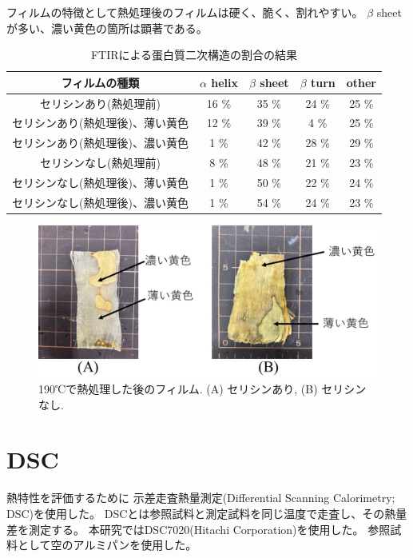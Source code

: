 \documentclass[dvipdfmx,12pt,a4paper]{jreport}
\begin{document}
			フィルムの特徴として熱処理後のフィルムは硬く、脆く、割れやすい。
			$\beta$ sheetが多い、濃い黄色の箇所は顕著である。
			\begin{table}[h]
				\centering
				\caption{FTIRによる蛋白質二次構造の割合の結果}
				\label{FTIR_蛋白質二次構造}
				\begin{tabular}{c c c c c} \hline
					フィルムの種類 & $\alpha$ helix & $\beta$ sheet &$\beta$ turn & other \\ \hline \hline
					セリシンあり(熱処理前) & 16 \% & 35 \% &  24 \% & 25 \% \\
					セリシンあり(熱処理後)、薄い黄色 &  12 \% & 39 \% & 4 \% & 25 \% \\
					セリシンあり(熱処理後)、濃い黄色 & 1 \% & 42 \% & 28 \% & 29 \% \\
					セリシンなし(熱処理前) & 8 \% & 48 \% &  21 \% & 23 \% \\
					セリシンなし(熱処理後)、薄い黄色 &  1 \% & 50 \% & 22 \% & 24 \% \\
					セリシンなし(熱処理後)、濃い黄色 & 1 \% & 54 \% & 24 \% & 23 \% \\ \hline
				\end{tabular}
			\end{table}
			\newpage
			\begin{figure}[h]
				\centering
				\includegraphics[scale=0.5]{シルクフィルム_熱処理後.jpg}
				\caption{190℃で熱処理した後のフィルム. (A) セリシンあり, (B) セリシンなし.}
				\label{熱処理後のフィルム}
			\end{figure}
			\newpage
			\section{DSC}
		\label{DSC}
		熱特性を評価するために
		示差走査熱量測定(Differential Scanning Calorimetry; DSC)を使用した。
		DSCとは参照試料と測定試料を同じ温度で走査し、その熱量差を測定する。
		本研究ではDSC7020(Hitachi Corporation)を使用した。
		参照試料として空のアルミパンを使用した。
	
\end{document}
